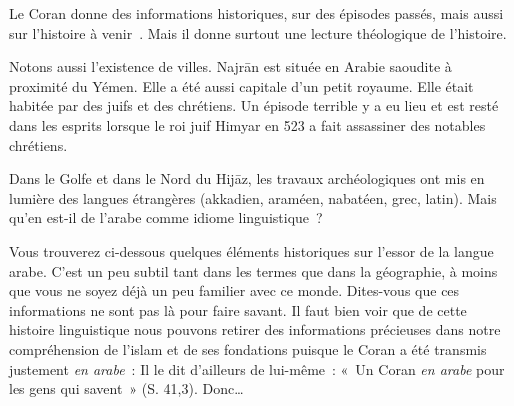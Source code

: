 \begin{Synthesis}
Le Coran donne des informations
historiques, sur des épisodes passés, mais aussi sur l'histoire à
venir~. Mais il donne
surtout une lecture théologique de l'histoire.
\end{Synthesis}

Notons aussi l'existence de villes. 
Najrān est située en Arabie saoudite
à proximité du Yémen. Elle a été aussi capitale d'un petit royaume. Elle
était habitée par des juifs et des chrétiens. Un épisode terrible y a eu
lieu et est resté dans les esprits lorsque le roi juif Himyar en 523 a
fait assassiner des notables chrétiens.



Dans le Golfe et dans le Nord du Hijāz, les travaux archéologiques ont
mis en lumière des langues étrangères (akkadien, araméen, nabatéen,
grec, latin). Mais qu'en est-il de l'arabe comme idiome linguistique~?


Vous trouverez ci-dessous quelques éléments historiques sur l'essor de
la langue arabe. C'est un peu subtil tant dans les termes que dans la
géographie, à moins que vous ne soyez déjà un peu familier avec ce
monde. Dites-vous que ces informations ne sont pas là pour faire savant.
Il faut bien voir que de cette histoire linguistique nous pouvons
retirer des informations précieuses dans notre compréhension de l'islam
et de ses fondations puisque le Coran a été transmis justement \emph{en
arabe}~: Il le dit d'ailleurs de lui-même~: «~Un Coran \emph{en arabe}
pour les gens qui savent~» (S. 41,3). Donc\ldots{}

